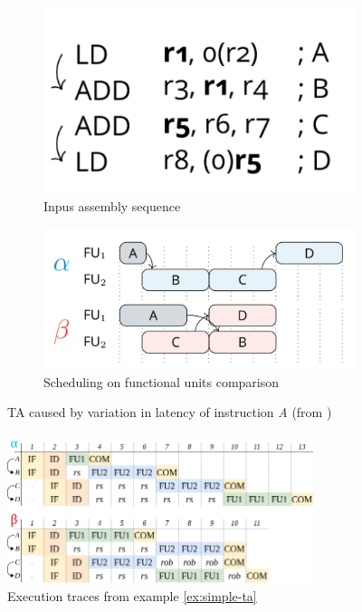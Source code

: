 \begin{figure}[htbp]
    \centering
    \begin{subfigure}[t]{0.3\textwidth}
        \centering
        \includegraphics[width=\textwidth]{figures/first-TA-ex-input.png}
        \caption{Inpus assembly sequence}
        \label{fig:TA1-code}
    \end{subfigure}
    \hfill
    \begin{subfigure}[t]{0.55\textwidth}
        \centering
        \includegraphics[width=\textwidth]{figures/first-TA-ex-trace.png}
        \caption{Scheduling on functional units comparison}
        \label{fig:TA1-trace}
    \end{subfigure}
    \caption{TA caused by variation in latency of instruction \textit{A} (from \cite{binder_definitions_2022})}
    \label{fig:TA1}
\end{figure}

\begin{figure}[htbp]
    \centering
    \includegraphics[width=0.8\textwidth]{figures/multiscalar_ta.png}
    \caption{Execution traces from example \ref{ex:simple-ta}}
    \label{fig:multiscalar-ta}
\end{figure}







